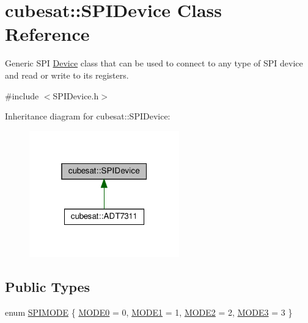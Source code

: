 \hypertarget{classcubesat_1_1SPIDevice}{}\section{cubesat\+:\+:S\+P\+I\+Device Class Reference}
\label{classcubesat_1_1SPIDevice}


Generic S\+PI \hyperlink{classcubesat_1_1Device}{Device} class that can be used to connect to any type of S\+PI device and read or write to its registers.  




{\ttfamily \#include $<$S\+P\+I\+Device.\+h$>$}



Inheritance diagram for cubesat\+:\+:S\+P\+I\+Device\+:\nopagebreak
\begin{figure}[H]
\begin{center}
\leavevmode
\includegraphics[width=184pt]{classcubesat_1_1SPIDevice__inherit__graph}
\end{center}
\end{figure}
\subsection*{Public Types}
\begin{DoxyCompactItemize}
\item 
enum \hyperlink{classcubesat_1_1SPIDevice_a68ceaba3194595c2f995f052a337a6d2}{S\+P\+I\+M\+O\+DE} \{ \hyperlink{classcubesat_1_1SPIDevice_a68ceaba3194595c2f995f052a337a6d2a72e11bc2725c991a91c97e618745c46b}{M\+O\+D\+E0} = 0, 
\hyperlink{classcubesat_1_1SPIDevice_a68ceaba3194595c2f995f052a337a6d2aa9818ce52cbf011d8acc212a692eb38e}{M\+O\+D\+E1} = 1, 
\hyperlink{classcubesat_1_1SPIDevice_a68ceaba3194595c2f995f052a337a6d2ae397160004392bdfc7c9b1fd395048a7}{M\+O\+D\+E2} = 2, 
\hyperlink{classcubesat_1_1SPIDevice_a68ceaba3194595c2f995f052a337a6d2af628b5366e5a3edac47722183d7242b3}{M\+O\+D\+E3} = 3
 \}
\end{DoxyCompactItemize}
